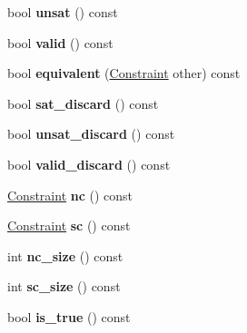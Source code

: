 \begin{DoxyCompactItemize}
\item 
\hypertarget{classConstraint_a9c5920cd6c466268623d02e6a8dec0a8}{bool {\bfseries unsat} () const }\label{classConstraint_a9c5920cd6c466268623d02e6a8dec0a8}

\item 
\hypertarget{classConstraint_a0aeb33d0859fe977b4ebe9a0c4388f80}{bool {\bfseries valid} () const }\label{classConstraint_a0aeb33d0859fe977b4ebe9a0c4388f80}

\item 
\hypertarget{classConstraint_a513104e3e2e3d937bf69bd31db952406}{bool {\bfseries equivalent} (\hyperlink{classConstraint}{\-Constraint} other) const }\label{classConstraint_a513104e3e2e3d937bf69bd31db952406}

\item 
\hypertarget{classConstraint_a16eef390b2a1174fee7302f8fa8ce47f}{bool {\bfseries sat\-\_\-discard} () const }\label{classConstraint_a16eef390b2a1174fee7302f8fa8ce47f}

\item 
\hypertarget{classConstraint_a9ec0c294cdf5617471b2f5dedcf576cc}{bool {\bfseries unsat\-\_\-discard} () const }\label{classConstraint_a9ec0c294cdf5617471b2f5dedcf576cc}

\item 
\hypertarget{classConstraint_abdfd75b78f0b60e837c9007c7384284d}{bool {\bfseries valid\-\_\-discard} () const }\label{classConstraint_abdfd75b78f0b60e837c9007c7384284d}

\item 
\hypertarget{classConstraint_a8cb788ba89071b63fb45c4101542b632}{\hyperlink{classConstraint}{\-Constraint} {\bfseries nc} () const }\label{classConstraint_a8cb788ba89071b63fb45c4101542b632}

\item 
\hypertarget{classConstraint_a341cc3ef346482fcb4e763662fd1c10c}{\hyperlink{classConstraint}{\-Constraint} {\bfseries sc} () const }\label{classConstraint_a341cc3ef346482fcb4e763662fd1c10c}

\item 
\hypertarget{classConstraint_a4c15a42e051b9d9f936e5c61f704cf6b}{int {\bfseries nc\-\_\-size} () const }\label{classConstraint_a4c15a42e051b9d9f936e5c61f704cf6b}

\item 
\hypertarget{classConstraint_a9cadd1975f3d26a4d58ce92362999a0b}{int {\bfseries sc\-\_\-size} () const }\label{classConstraint_a9cadd1975f3d26a4d58ce92362999a0b}

\item 
\hypertarget{classConstraint_ab4ea8f8060354f33b6a47757e919b6de}{bool {\bfseries is\-\_\-true} () const }\label{classConstraint_ab4ea8f8060354f33b6a47757e919b6de}


\end{DoxyCompactItemize}

